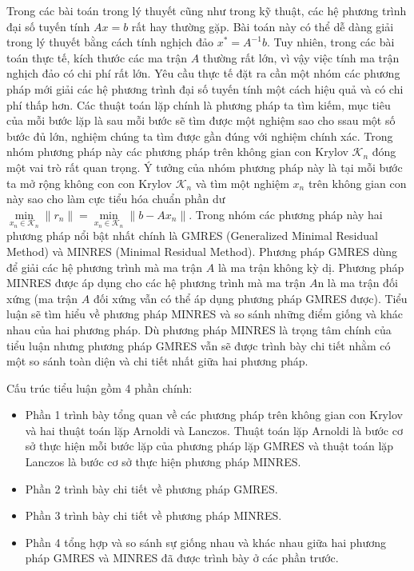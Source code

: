 \documentclass[14pt, a4paper]{article}
\numberwithin{equation}{section}
\numberwithin{algorithm}{section}
\numberwithin{figure}{section}
\numberwithin{dl}{section}
\numberwithin{md}{section}
\numberwithin{bd}{section}
\numberwithin{dn}{section}
\numberwithin{hq}{section}
\begin{document}
Trong các bài toán trong lý thuyết cũng như trong kỹ thuật, các hệ phương trình đại số tuyến tính $Ax=b$ rất hay thường gặp. Bài toán này có thể dễ dàng giải trong lý thuyết bằng cách tính nghịch đảo $x^* = A^{-1}b$. Tuy nhiên, trong các bài toán thực tế, kích thước các ma trận $A$ thường rất lớn, vì vậy việc tính ma trận nghịch đảo có chi phí rất lớn. Yêu cầu thực tế đặt ra cần một nhóm các phương pháp mới giải các hệ phương trình đại số tuyến tính một cách hiệu quả và có chi phí thấp hơn.
Các thuật toán lặp chính là phương pháp ta tìm kiếm, mục tiêu của mỗi bước lặp là sau mỗi bước sẽ tìm được một nghiệm sao cho ssau một số bước đủ lớn, nghiệm chúng ta tìm được gần đúng với nghiệm chính xác. Trong nhóm phương pháp này các phương pháp trên không gian con Krylov $\mathcal{K}_n$ đóng một vai trò rất quan trọng. Ý tưởng của nhóm phương pháp này là tại mỗi bước ta mở rộng không con con Krylov $\mathcal{K}_n$ và tìm một nghiệm $x_n$ trên không gian con này sao cho làm cực tiểu hóa chuẩn phần dư $\underset{x_n \in \mathcal{K}_n}{\min}\lVert r_n \rVert = \underset{x_n \in \mathcal{K}_n}{\min}\lVert b - A x_n \rVert$. Trong nhóm các phương pháp này hai phương pháp nổi bật nhất chính là GMRES (Generalized Minimal Residual Method) và MINRES (Minimal Residual Method).
Phương pháp GMRES dùng để giải các hệ phương trình mà ma trận $A$ là ma trận không kỳ dị. Phương pháp MINRES được áp dụng cho các hệ phương trình mà ma trận $A$n là ma trận đối xứng (ma trận $A$ đối xứng vẫn có thể áp dụng phương pháp GMRES được). Tiểu luận sẽ tìm hiểu về phương pháp MINRES và so sánh những điểm giống và khác nhau của hai phương pháp. Dù phương pháp MINRES là trọng tâm chính của tiểu luận nhưng phương pháp GMRES vẫn sẽ được trình bày chi tiết nhằm có một so sánh toàn diện và chi tiết nhất giữa hai phương pháp.

Cấu trúc tiểu luận gồm 4 phần chính:

\begin{itemize}
    \item Phần 1 trình bày tổng quan về các phương pháp trên không gian con Krylov và hai thuật toán lặp Arnoldi và Lanczos. Thuật toán lặp Arnoldi là bước cơ sở thực hiện mỗi bước lặp của phương pháp lặp GMRES và thuật toán lặp Lanczos là bước cơ sở thực hiện phương pháp MINRES.
    \item Phần 2 trình bày chi tiết về phương pháp GMRES.
    \item Phần 3 trình bày chi tiết về phương pháp MINRES.
    \item Phần 4 tổng hợp và so sánh sự giống nhau và khác nhau giữa hai phương pháp GMRES và MINRES đã được trình bày ở các phần trước.
\end{itemize}
\newpage
\end{document}
